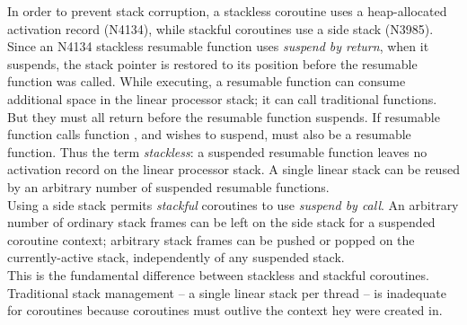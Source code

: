 In order to prevent stack corruption, a stackless coroutine uses a heap-allocated
activation record (N4134\cite{N4134}), while stackful coroutines use a side
stack (N3985\cite{N3985}).\\
Since an N4134 stackless resumable function uses \emph{suspend by return},
when it suspends, the stack pointer is restored to its position before the
resumable function was called. While executing, a resumable function can
consume additional space in the linear processor stack; it can call
traditional functions. But they must all return before the resumable function
suspends. If resumable function  calls function , and
 wishes to suspend,  must also be a resumable function. Thus
the term \emph{stackless}: a suspended resumable function leaves no activation
record on the linear processor stack. A single linear stack can be reused by
an arbitrary number of suspended resumable functions.\\
Using a side stack permits \emph{stackful} coroutines to use \emph{suspend by
call}. An arbitrary number of ordinary stack frames can be left on the side
stack for a suspended coroutine context; arbitrary stack frames can be pushed
or popped on the currently-active stack, independently of any suspended stack.\\
This is the fundamental difference between stackless and stackful coroutines.\\
\newline
Traditional stack management -- a single linear stack per thread -- is
inadequate for coroutines because coroutines must outlive the context hey were
created in.

